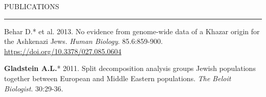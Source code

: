\documentclass{resume} %
\renewenvironment{rSection}[1]{
\sectionskip
\textcolor{RoyalPurple}{\MakeUppercase{#1}}
\sectionlineskip
\hrule
\begin{list}{}{
\setlength{\leftmargin}{1.5em}
}
\item[]
}{
\end{list}
}
\begin{document}
\begin{rSection}{Publications}
\item Behar D.* et al. 2013. No evidence from genome-wide data of a Khazar origin for the Ashkenazi Jews. \textit{Human Biology}. 85.6:859-900. \url{https://doi.org/10.3378/027.085.0604}

\item \textbf{Gladstein A.L.}* 2011. Split decomposition analysis groups Jewish populations together between European and Middle Eastern populations. \textit{The Beloit Biologist}. 30:29-36.

\end{rSection}

\end{document}
